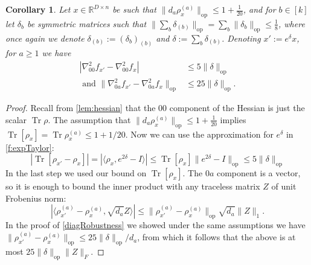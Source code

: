 \documentclass[aos]{imsart}
\newtheorem{corollary}[theorem]{Corollary}
\theoremstyle{definition}
\numberwithin{equation}{section}
\DeclareMathOperator{\op}{op}
\DeclareMathOperator{\tr}{Tr}
\newcommand{\R}{{\mathbb{R}}}
\newcommand{\samp}{x}
\begin{document}
\begin{appendix}
\begin{corollary} \label{constantRobustness}
Let $\samp \in \R^{D \times n}$ be such that $\|d_{a} \rho_{\samp}^{(a)}\|_{\op} \leq 1 + \frac{1}{20}$, and for $b \in [k]$ let $\delta_b$ be symmetric matrices such that $\|\sum_{b} \delta_{(b)}\|_{\op} = \sum_{b} \|\delta_{b}\|_{\op} \leq \frac{1}{8}$, where once again we denote $\delta_{(b)} := (\delta_b)_{(b)}$ and $\delta := \sum_b \delta_{(b)}$.
Denoting $\samp' := e^{\delta} \samp$, for $a \geq 1$ we have
\begin{align*} |\nabla^{2}_{00} f_{\samp'} - \nabla^{2}_{00} f_{\samp}| &\leq 5 \|\delta\|_{\op}  \\
\text{ and } \|\nabla^{2}_{0a} f_{\samp'} - \nabla^{2}_{0a} f_{\samp}\|_{\op} &\leq 25 \|\delta\|_{\op} .  \end{align*}
\end{corollary}
\begin{proof}
Recall from \cref{lem:hessian} that the $00$ component of the Hessian is just the scalar $\tr \rho$. The assumption that $\|d_{a} \rho_{\samp}^{(a)}\|_{\op} \leq 1 + \frac{1}{20}$ implies $\tr[\rho_{\samp}] = \tr \rho_{\samp}^{(a)} \leq 1 + 1/20$. Now we can use the approximation for $e^{\delta}$ in \cref{f:expTaylor}:
\[ |\tr[\rho_{\samp'} - \rho_{\samp}]| = |\langle \rho_{\samp}, e^{2\delta} - I \rangle| \leq \tr[\rho_{\samp}] \|e^{2 \delta} - I\|_{\op} \leq 5 \|\delta\|_{\op}     \]
In the last step we used our bound on $\tr[\rho_{\samp}].$
The $0a$ component is a vector, so it is enough to bound the inner product with any traceless matrix $Z$ of unit Frobenius norm:
\[ |\langle \rho_{\samp'}^{(a)} - \rho_{\samp}^{(a)}, \sqrt{d_{a}} Z \rangle| \leq \|\rho_{\samp'}^{(a)} - \rho_{\samp}^{(a)}\|_{\op} \sqrt{d_{a}} \|Z\|_{1}. \]
In the proof of \cref{diagRobustness} we showed under the same assumptions we have $\|\rho_{\samp'}^{(a)} - \rho_{\samp}^{(a)}\|_{\op} \leq 25 \|\delta\|_{\op}/d_a$, from which it follows that the above is at most $25 \|\delta\|_{\op} \|Z\|_{F}.$ \end{proof}


\end{appendix}
\end{document}

